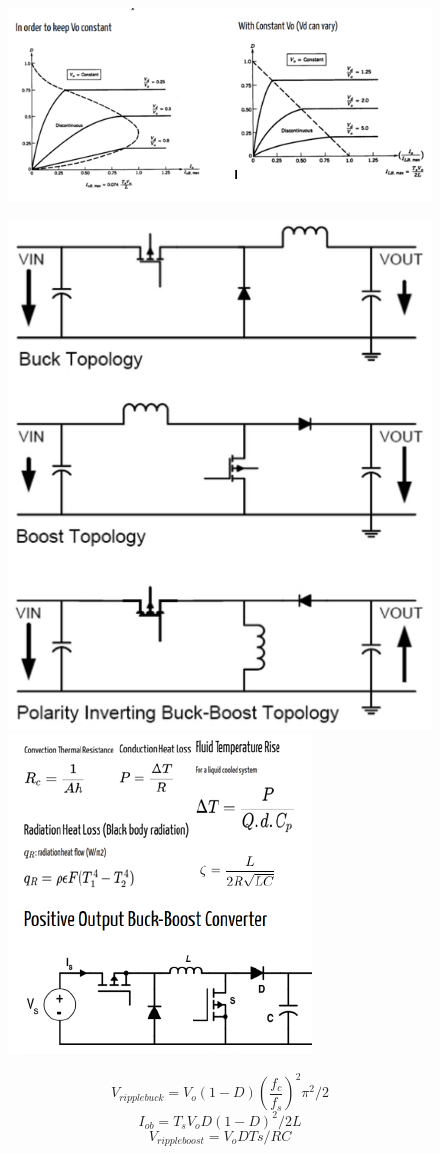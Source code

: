 \documentclass[twocolumn, ]{article}
\begin{document}
\begin{figure}[!ht]
	\includegraphics[scale=0.7]{bla}
\end{figure}

\begin{figure}[!ht]

{
\includegraphics[scale=0.3]{topo}
\hspace{0.2 cm}
\includegraphics[scale=0.6]{posbb}
}


\end{figure}
$$ V_{ripplebuck}=V_o (1-D) {(\dfrac{f_c}{f_s})}^2 \pi^2 /2 $$ $$I_{ob}=T_s V_o  D (1-D)^2 /{2L} $$ $$ V_{rippleboost}=V_o D Ts/{RC}$$
\end{document}
